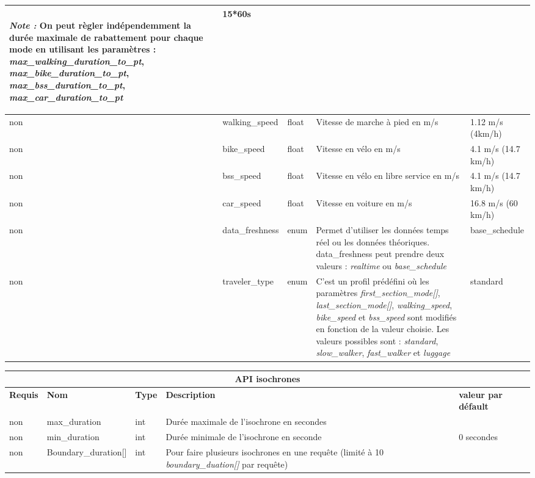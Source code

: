 \documentclass[a4paper]{report}
\begin{document}
\begin{center}
\begin{tabular}{|l|l|p{1.5cm}|p{6cm}|l|}
	\paragraph{}\emph{Note :} On peut règler indépendemment la durée maximale de rabattement pour chaque mode en utilisant les paramètres : \emph{max\_walking\_duration\_to\_pt}, \emph{max\_bike\_duration\_to\_pt}, \emph{max\_bss\_duration\_to\_pt}, \emph{max\_car\_duration\_to\_pt} & 15*60s \\
	\hline
	non & walking\_speed & float & Vitesse de marche à pied en m/s & 1.12 m/s (4km/h) \\
	\hline
	non & bike\_speed & float & Vitesse en vélo en m/s & 4.1 m/s (14.7 km/h) \\
	\hline
	non & bss\_speed & float & Vitesse en vélo en libre service en m/s & 4.1 m/s (14.7 km/h) \\
	\hline
	non & car\_speed & float & Vitesse en voiture en m/s & 16.8 m/s (60 km/h) \\
	\hline
	non & data\_freshness & enum & Permet d'utiliser les données temps réel ou les données théoriques. data\_freshness peut prendre deux valeurs : \emph{realtime} ou \emph{base\_schedule} & base\_schedule \\
	\hline
	non & traveler\_type & enum & C'est un profil prédéfini où les paramètres \emph{first\_section\_mode[]}, \emph{last\_section\_mode[]}, \emph{walking\_speed}, \emph{bike\_speed} et \emph{bss\_speed} sont modifiés en fonction de la valeur choisie. Les valeurs possibles sont : \emph{standard}, \emph{slow\_walker}, \emph{fast\_walker} et \emph{luggage} & standard \\
	\hline
	\end{tabular}
\end{center}

\begin{center}
	\begin{tabular}{|l|l|p{1.5cm}|p{6cm}|l|}
	\hline
	\multicolumn{5}{|c|}{\cellcolor{LightCyan} \textbf{API isochrones}} \\
	\hline
	\textbf{Requis} & \textbf{Nom} & \textbf{Type} & \textbf{Description} &  \textbf{valeur par défault} \\
	\hline
	non & max\_duration & int & Durée maximale de l'isochrone en secondes &\\
	\hline
	non & min\_duration & int & Durée minimale de l'isochrone en seconde & 0 secondes\\
	\hline
	non & Boundary\_duration[] & int & Pour faire plusieurs isochrones en une requête (limité à 10 \emph{boundary\_duation[]} par requête) & \\
	\hline
	\end{tabular}
\end{center}
\end{document}
